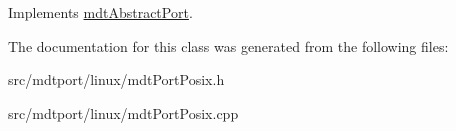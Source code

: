 Implements \hyperlink{classmdt_abstract_port_a64d4802975a76474b9196c91f57a6d90}{mdtAbstractPort}.



The documentation for this class was generated from the following files:\begin{DoxyCompactItemize}
\item 
src/mdtport/linux/mdtPortPosix.h\item 
src/mdtport/linux/mdtPortPosix.cpp\end{DoxyCompactItemize}

